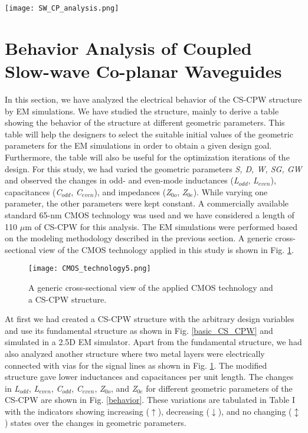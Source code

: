 \documentclass[journal]{IEEEtran}
\begin{document}
\begin{figure*}
	\texttt{[image: SW\_CP\_analysis.png]}
	\caption{Simplified representation of modeling a coupled slow-wave coplanar waveguide.}
	\label{modeling_method}
\end{figure*}


\section{Behavior Analysis of Coupled Slow-wave Co-planar Waveguides}

In this section, we have analyzed the electrical behavior of the CS-CPW structure by EM
simulations. We have studied the structure, mainly to derive a table showing the behavior of the structure at different geometric parameters. This table will help the designers to select the suitable initial values of the geometric parameters for the EM simulations in order to obtain a given design goal. Furthermore, the table will also be useful for the optimization iterations of the design. 
For this study, we had varied the geometric parameters \textit{S, D, W, SG, GW} and observed the changes in odd- and even-mode inductances (\textit{L$_{odd}$}, \textit{L$_{even}$}), capacitances (\textit{C$_{odd}$}, \textit{C$_{even}$}), and impedances (\textit{Z$_{0o}$}, \textit{Z$_{0e}$}). While varying one parameter, the other parameters were kept constant. A commercially available standard 65-nm CMOS technology was used and we have considered a length of 110 $\mu$m of CS-CPW for this analysis. The EM simulations were performed based on the modeling methodology described in the previous section. A generic cross-sectional view of the CMOS technology applied in this study is shown in Fig. \ref{tech_cross}.

\begin{figure}
	\texttt{[image: CMOS\_technology5.png]}
	\caption{A generic cross-sectional view of the applied CMOS technology and a CS-CPW structure.}
	\label{tech_cross}
\end{figure}

At first we had created a CS-CPW structure with the arbitrary design variables and use its fundamental structure as shown in Fig. \ref{basic_CS_CPW} and simulated in a 2.5D EM simulator. Apart from the fundamental structure, we had also analyzed another structure where two metal layers were electrically connected with vias for the signal lines as shown in Fig. \ref{tech_cross}. The modified structure gave lower inductances and capacitances per unit length. The changes in \textit{L$_{odd}$}, \textit{L$_{even}$}, \textit{C$_{odd}$}, \textit{C$_{even}$}, \textit{Z$_{0o}$}, and \textit{Z$_{0e}$} for different geometric parameters of the CS-CPW are shown in Fig. \ref{behavior}. These variations are tabulated in Table I with the indicators showing increasing ($\uparrow$), decreasing ($\downarrow$), and no changing ($\updownarrow$) states over the changes in geometric parameters.
\end{document}
